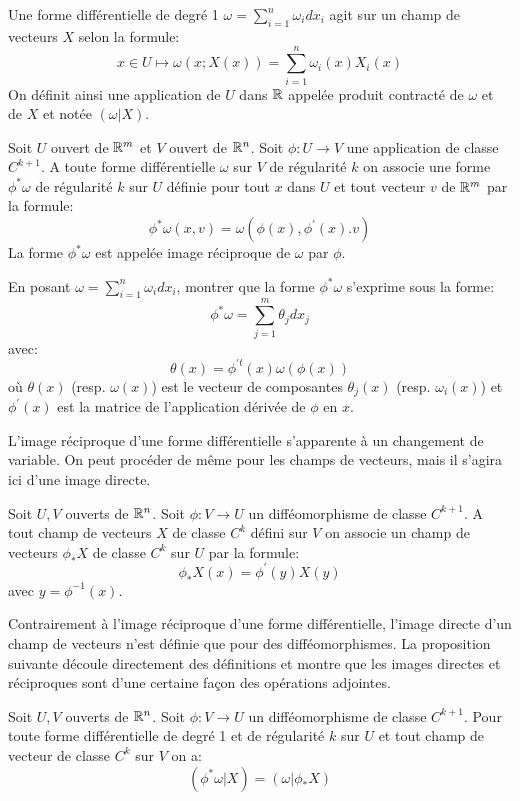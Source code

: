 Une forme différentielle de degré 1 $\omega = \sum_{i=1}^n \omega_i dx_i$ agit sur un champ de vecteurs $X$ selon la formule:
\[
x \in U \mapsto \omega(x;X(x)) = \sum_{i=1}^n \omega_i(x) X_i(x)
\]
On définit ainsi une application de $U$ dans $\mathbb{R}$ appelée produit contracté de $\omega$ et de $X$ et notée $(\omega | X)$. 
\begin{fdefn}
Soit $U$ ouvert de $\mathbb{R}^m$ et $V$ ouvert de $\mathbb{R}^n$. Soit $\phi \colon U \to V$ une application de classe $C^{k+1}$. A toute forme différentielle $\omega$ sur $V$ de régularité $k$ on associe une forme $\phi^*\omega$ de régularité $k$  sur $U$ définie pour tout $x$ dans $U$ et tout vecteur $v$ de $\mathbb{R}^m$ par la formule:
\[
\phi^*\omega(x,v) = \omega(\phi(x),\phi^\prime(x).v)
\]
La forme $\phi^*\omega$ est appelée image réciproque de $\omega$ par $\phi$.
\end{fdefn}
\begin{exercice}
En posant $\omega = \sum_{i=1}^n \omega_i dx_i$,
montrer que la forme $\phi^*\omega$ s'exprime sous la forme:
\[
\phi^*\omega = \sum_{j=1}^m \theta_j dx_j
\]
avec:
\[
\theta(x) = \phi^{\prime t} (x) \omega(\phi(x)) 
\]
où $\theta(x)$ (resp. $\omega(x)$) est le vecteur de composantes $\theta_j(x)$ (resp. $\omega_i(x)$) et $\phi^\prime(x)$ est la matrice de l'application dérivée de $\phi$ en $x$. 
\end{exercice}
L'image réciproque d'une forme différentielle s'apparente à un changement de variable. On peut procéder de même pour les champs de vecteurs, mais il s'agira ici d'une image directe.
\begin{fdefn}
Soit $U,V$ ouverts de $\mathbb{R}^n$. Soit $\phi \colon V \to U$ un difféomorphisme de classe $C^{k+1}$. A tout champ de vecteurs $X$ de classe $C^k$ défini sur $V$ on associe un champ de vecteurs $\phi_* X$ de classe $C^k$ sur $U$ par la formule:
\[
\phi_* X(x) = \phi^\prime(y) X(y)
\]
avec $y = \phi^{-1}(x)$.
\end{fdefn}
Contrairement à l'image réciproque d'une forme différentielle, l'image directe d'un champ de vecteurs n'est définie que pour des difféomorphismes. La proposition suivante découle directement des définitions et montre que les images directes et réciproques sont d'une certaine façon des opérations adjointes.  
\begin{prop}
Soit $U,V$ ouverts de $\mathbb{R}^n$. Soit $\phi \colon V \to U$ un difféomorphisme de classe $C^{k+1}$. Pour toute forme différentielle de degré 1 et de régularité $k$ sur $U$ et tout champ de vecteur de classe $C^k$ sur $V$ on a:
\[
\left(\phi^* \omega | X \right) = \left(\omega | \phi_* X \right)
\]
\end{prop}
